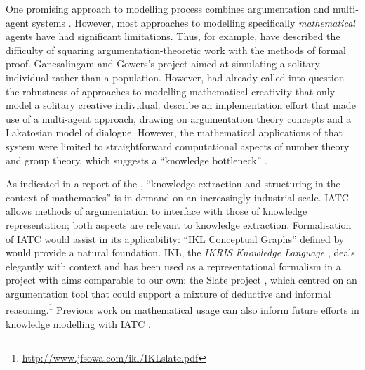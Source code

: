 \documentclass[smallextended,oneside]{svjour3}       %
\let\cite\citep
\newcommand\nothing[1]{#1}
\let\paragraph\nothing
\begin{document}
One promising approach to modelling process combines argumentation and multi-agent
systems
\cite{modgil2007towards,maghraby2012automated,Robertson2012}.
However, most approaches to modelling specifically \emph{mathematical}
agents have had significant limitations.
%
Thus, for example, \citet{fiedler2007argumentation} have described the difficulty of
squaring argumentation-theoretic work with the methods of formal
proof.  Ganesalingam and Gowers's \citeyearpar{ganesalingam2016fully}
project aimed at simulating a solitary individual rather than a
population.  However, \citet{furse1990did} had already called into question the robustness of approaches to modelling mathematical creativity that only model a solitary creative individual.
\citet{pease2009bridging} describe an implementation effort
that made use of a multi-agent approach, drawing on argumentation
theory concepts and a Lakatosian model of dialogue.  However,
the mathematical applications of that system were limited to
straightforward computational aspects of number theory and group theory, which
suggests a ``knowledge bottleneck''
\cite{saint2016argument,moens2017argumentation}.

\paragraph{As indicated in a report of the \citet[p.~90]{national2014developing}, ``knowledge extraction and structuring in the context of mathematics'' is in demand on an increasingly industrial scale.}
IATC allows methods of argumentation to interface with those of
knowledge representation; both aspects are relevant to knowledge
extraction.  Formalisation of IATC would assist in its
applicability: ``IKL Conceptual Graphs'' defined by
\citet{sowa2008conceptual} would provide a natural foundation.  IKL,
the \emph{IKRIS Knowledge Language} \cite{hayes2006ikl,sowa2008conceptual},
deals elegantly with context and has been used as a representational
formalism in a project with aims comparable to our own: the Slate
project \cite{bringsjord2008slate}, which centred on an argumentation
tool that could support a mixture of deductive and informal
reasoning.\footnote{\url{http://www.jfsowa.com/ikl/IKLslate.pdf}}
Previous work on mathematical usage can also inform future efforts in
knowledge modelling with IATC \cite{trzeciak2012mathematical,wells2003handbook,
  wolska2015students,ginev2011structure}.  
\end{document}

